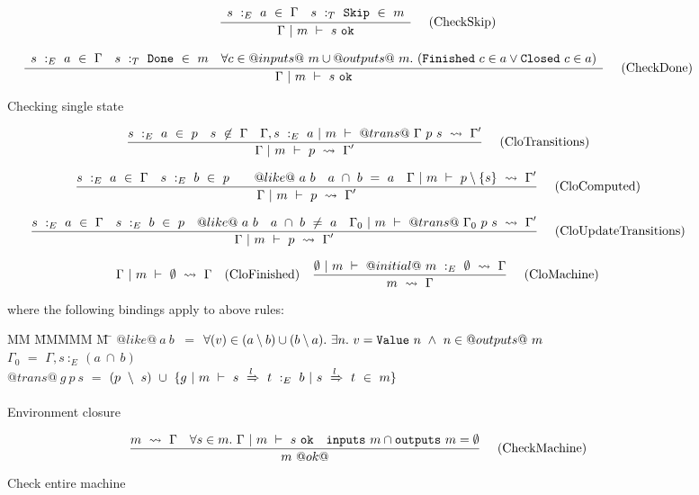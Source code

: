 \begin{figure*}
$$
\frac {\displaystyle 
    \begin{array}{lr}
        s~:_E~ a ~\in~ \Gamma                &
        s ~:_T~ \mathtt{Skip} ~\in~m
    \end{array}
} {\displaystyle  
    \Gamma ~|~ m ~\vdash~ s~\mathtt{ok}
} \ 
\quad
\textrm{(CheckSkip)}
$$

$$
\frac {\displaystyle 
    \begin{array}{lcr}
        s~:_E~ a ~\in~ \Gamma                &
        s ~:_T~ \mathtt{Done} ~\in~m    &
        \forall c \in @inputs@~m \cup @outputs@~m.~(\mathtt{Finished}~c \in a \vee \mathtt{Closed}~c \in a)
    \end{array}
} {\displaystyle  
    \Gamma ~|~ m ~\vdash~ s~\mathtt{ok}
} \ 
\quad
\textrm{(CheckDone)}
$$

\caption{Checking single state}
\label{fig:inv:checking}
\end{figure*}

\begin{figure*}

$$
\frac {\displaystyle 
    s~:_E~a~\in~p
    \quad
    s~\not\in~\Gamma
    \quad
    \Gamma,s~:_E~a ~|~ m ~\vdash~ @trans@~\Gamma~p~s ~\rightsquigarrow~ \Gamma'
} {\displaystyle 
    \Gamma ~|~ m ~\vdash~ p ~\rightsquigarrow~ \Gamma'
} \ 
\quad
\textrm{(CloTransitions)}
$$

$$
\frac {\displaystyle 
    s~:_E~ a ~\in~ \Gamma
    \quad
    s~:_E~b~\in~p
    \quad
    \quad
    @like@~a~b
    \quad
    a~\cap~b~=~a
    \quad
    \Gamma ~|~ m ~\vdash~ p \setminus \{s\} ~\rightsquigarrow~ \Gamma'
} {\displaystyle 
    \Gamma ~|~ m ~\vdash~ p ~\rightsquigarrow~ \Gamma'
} \ 
\quad
\textrm{(CloComputed)}
$$

$$
\frac {\displaystyle 
    s~:_E~ a ~\in~ \Gamma
    \quad
    s~:_E~b~\in~p
    \quad
    @like@~a~b
    \quad
    a~\cap~b~\not=~a
    \quad
    \Gamma_0 ~|~ m ~\vdash~ @trans@~\Gamma_0~p~s ~\rightsquigarrow~ \Gamma'
} {\displaystyle 
    \Gamma ~|~ m ~\vdash~ p ~\rightsquigarrow~ \Gamma'
} \ 
\quad
\textrm{(CloUpdateTransitions)}
$$


$$
\Gamma ~|~ m ~\vdash~ \emptyset ~\rightsquigarrow~ \Gamma
\quad
\textrm{(CloFinished)}
\quad
\frac {\displaystyle 
    \emptyset ~|~ m ~\vdash~ @initial@~m~:_E~\emptyset ~\rightsquigarrow~ \Gamma
} {\displaystyle 
    m ~\rightsquigarrow~ \Gamma
} \ 
\quad
\textrm{(CloMachine)}
$$

where the following bindings apply to above rules:
\begin{tabbing}
MM \= MMMMM \= M \= \kill
\> $@like@~a~b~$ \> $=$ \>
    $\forall(v) \in (a \setminus b) \cup (b \setminus a).~\exists n.~v=\mathtt{Value}~n~\wedge~n \in @outputs@~m$
\\
\> $\Gamma_0$ \> $=$ $\Gamma, s~:_E~(a~\cap~b)$ \\
\> $@trans@~g~p~s$ \> $=$ \> $(p~\setminus~s)~\cup~\{ g ~|~ m ~\vdash~ s~\xRightarrow{l}~t ~:_E~ b ~|~ s~\xRightarrow{l}~ t~\in~ m\}$
\end{tabbing}

\caption{Environment closure}
\label{fig:inv:closure}
\end{figure*}


\begin{figure*}

$$
\frac {\displaystyle 
    m ~\rightsquigarrow~ \Gamma
    \quad
    \forall s \in m.\ \Gamma ~|~ m ~\vdash~ s~\mathtt{ok}
    \quad
    \mathtt{inputs}~m \cap \mathtt{outputs}~m = \emptyset
} {\displaystyle 
    m~@ok@
} \ 
\quad
\textrm{(CheckMachine)}
$$


\caption{Check entire machine}
\label{fig:inv:entire}
\end{figure*}

